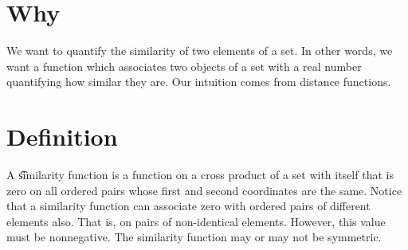 
\section*{Why}

We want to quantify the similarity of two elements of a set.
In other words, we want a function which associates two objects of a set with a real number quantifying how similar they are.
Our intuition comes from distance functions.

\section*{Definition}

A \t{similarity function} is a function on a cross product of a set with itself that is zero on all ordered pairs whose first and second coordinates are the same.
Notice that a similarity function can associate zero with ordered pairs of different elements also.
That is, on pairs of non-identical elements.
However, this value must be nonnegative.
The similarity function may or may not be symmetric.

\blankpage